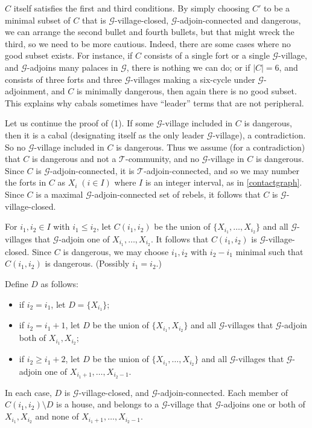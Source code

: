 \documentclass[titlepage,11pt]{article}
\def\LL{,\ldots,}
\newcommand{\mac}{\mathcal}
\begin{document}
	$C$ itself satisfies the first and third conditions. By simply choosing $C'$ to be a minimal subset of $C$ that
	is $\mac G$-village-closed,  $\mac G$-adjoin-connected and dangerous, we can arrange the second bullet and fourth bullets, but that might wreck the third,
	so we need to be more cautious. Indeed, there are some cases where no good subset exists. For instance, if $C$ consists of a 
	single fort or a single $\mac G$-village, and $\mac G$-adjoins many palaces in $\mac G$, there is nothing we can do; or if $|C|=6$,
	and consists of three forts and three $\mac G$-villages making a six-cycle under $\mac G$-adjoinment, and $C$ is minimally dangerous,
	then again there is no good subset. This explains why cabals sometimes have ``leader'' terms that are not peripheral. 
	
	Let us continue the proof of (1).
	If some $\mac G$-village included in $C$ is dangerous, then it is a cabal (designating itself as the only leader $\mac G$-village), a contradiction. So
	no $\mac G$-village included in $C$ is dangerous.
	Thus we assume (for a contradiction) that $C$ is dangerous and not a $\mac T$-community, and no $\mac G$-village in $C$ is dangerous.
	Since $C$ is $\mac G$-adjoin-connected, it is $\mac T$-adjoin-connected, and so we may number the forts in
	$C$ as $X_i\;(i\in I)$ where $I$ is an integer interval, as in \ref{contactgraph}.
	Since $C$ is a maximal $\mac G$-adjoin-connected set of rebels, it follows that $C$ is $\mac G$-village-closed.
	
	For $i_1,i_2\in I$ with $i_1\le i_2$, let $C(i_1,i_2)$ be the union of $\{X_{i_1}\LL X_{i_2}\}$ and all $\mac G$-villages that $\mac G$-adjoin
	one of $X_{i_1}\LL X_{i_2}$.
	It follows that
	$C(i_1,i_2)$ is $\mac G$-village-closed.
	Since $C$ is dangerous, we may choose $i_1,i_2$ with $i_2-i_1$ minimal such that $C(i_1,i_2)$ is dangerous. (Possibly $i_1=i_2$.)
	
	Define $D$ as follows:
	\begin{itemize}
		\item if $i_2=i_1$, let $D=\{X_{i_1}\}$;
		\item if $i_2=i_1+1$, let $D$ be the union of $\{X_{i_1}, X_{i_2}\}$ and all $\mac G$-villages that $\mac G$-adjoin  both of $X_{i_1}, X_{i_2}$;
		\item if $i_2\ge i_1+2$, let 
		$D$ be the union of $\{X_{i_1}\LL X_{i_2}\}$ and all $\mac G$-villages that $\mac G$-adjoin one of $X_{i_1+1}\LL X_{i_2-1}$.
	\end{itemize}
	In each case, 
	$D$ is $\mac G$-village-closed, and $\mac G$-adjoin-connected.
	Each member of $C(i_1,i_2)\setminus D$ is a house, and belongs to a $\mac G$-village that $\mac G$-adjoins one or both of $X_{i_1},X_{i_2}$ and none of
	$X_{i_1+1}\LL X_{i_2-1}$.
	
\end{document}
